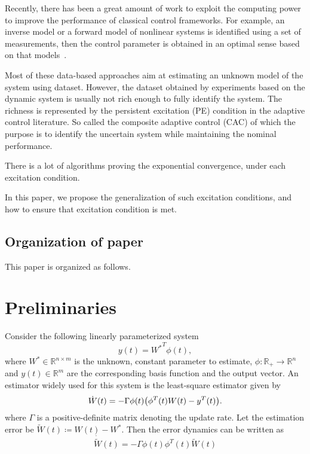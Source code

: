 \documentclass[]{IEEEtran}
\theoremstyle{definition}
\theoremstyle{remark}
\newcommand{\MB}[1]{\mathbb{#1}}
\begin{document}
Recently, there has been a great amount of work to exploit the computing power
to improve the performance of classical control frameworks. For example, an
inverse model or a forward model of nonlinear systems is identified using a set
of measurements, then the control parameter is obtained in an optimal sense
based on that models~\cite{novara_data-driven_2018}.

Most of these data-based approaches aim at estimating an unknown model of the
system using dataset. However, the dataset obtained by experiments based on the
dynamic system is usually not rich enough to fully identify the system. The
richness is represented by the persistent excitation (PE) condition in the
adaptive control literature. So called the composite adaptive control (CAC)
of which the purpose is to identify the uncertain system while maintaining the
nominal performance.

There is a lot of algorithms proving the exponential convergence, under each
excitation condition.

In this paper, we propose the generalization of such excitation conditions, and
how to ensure that excitation condition is met.

\subsection{Organization of paper}

This paper is organized as follows.


\section{Preliminaries}

Consider the following linearly parameterized system
\begin{equation*}
	y(t) = {W^\ast}^T \phi(t),
\end{equation*}
where $W^\ast \in \MB{R}^{n \times m}$ is the unknown, constant parameter to
estimate, $\phi: \MB{R}_{+} \to \MB{R}^n$ and $y(t) \in \MB{R}^m$ are the
corresponding basis function and the output vector. An estimator widely used
for this system is the least-square estimator given by
\begin{equation}\label{eq:estimation system}
	\dot{W}(t) =  - \Gamma \phi(t) \qty(\phi^T(t) W(t) - y^T(t)).
\end{equation}
where $\Gamma$ is a positive-definite matrix denoting the update rate. Let the
estimation error be $\tilde{W}(t) \coloneqq W(t) - W^\ast$. Then the error
dynamics can be written as
\begin{equation}\label{eq:estimation error system}
	\dot{\tilde{W}} (t) = - \Gamma \phi(t) \phi^T(t) \tilde{W}(t)
\end{equation}
\end{document}
